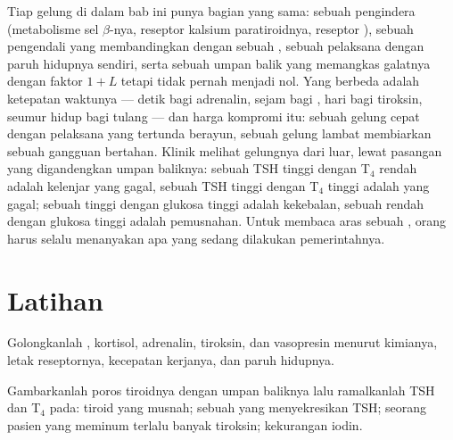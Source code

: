 \begin{remark}\label{rem:b3:endocrinology:control}
Tiap gelung di dalam bab ini punya bagian yang sama: sebuah pengindera (metabolisme
sel $\beta$-nya, reseptor kalsium paratiroidnya,
reseptor  ), sebuah pengendali yang membandingkan dengan
sebuah , sebuah  pelaksana dengan paruh hidupnya sendiri, serta sebuah
umpan balik yang memangkas galatnya dengan faktor $1 + L$ tetapi tidak pernah menjadi nol.
Yang berbeda adalah ketepatan waktunya --- detik bagi adrenalin, sejam bagi
, hari bagi tiroksin, seumur hidup bagi tulang --- dan harga
kompromi itu: sebuah gelung cepat dengan pelaksana yang tertunda berayun, sebuah gelung
lambat membiarkan sebuah gangguan bertahan. Klinik melihat gelungnya dari
luar, lewat pasangan yang digandengkan umpan baliknya: sebuah TSH tinggi dengan
T$_{4}$ rendah adalah kelenjar yang gagal, sebuah TSH tinggi dengan T$_{4}$ tinggi adalah
 yang gagal; sebuah  tinggi dengan glukosa tinggi adalah kekebalan, sebuah
 rendah dengan glukosa tinggi adalah pemusnahan. Untuk membaca aras sebuah ,
orang harus selalu menanyakan apa yang sedang dilakukan pemerintahnya.
\end{remark}

\section{Latihan}

\begin{exercise}[$\star$]\label{exo:b3:endocrinology:1}
Golongkanlah , kortisol, adrenalin, tiroksin, dan vasopresin menurut
kimianya, letak reseptornya, kecepatan kerjanya, dan paruh hidupnya.
\end{exercise}

\begin{exercise}[$\star$]\label{exo:b3:endocrinology:2}
Gambarkanlah poros tiroidnya dengan umpan baliknya lalu ramalkanlah TSH dan T$_{4}$ pada:
tiroid yang musnah; sebuah   yang menyekresikan TSH; seorang pasien yang meminum
terlalu banyak tiroksin; kekurangan iodin.
\end{exercise}

